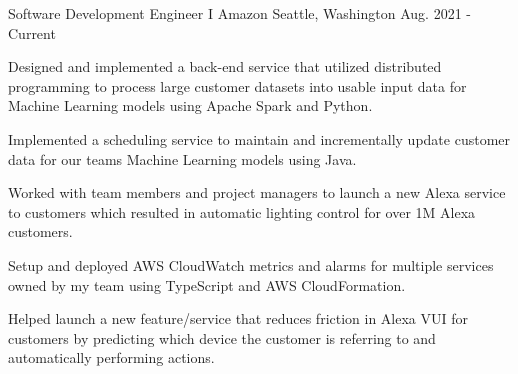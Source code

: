 

\begin{cventries}

  \cventry
  {Software Development Engineer I} %
  {Amazon} %
  {Seattle, Washington} %
  {Aug. 2021 - Current} %
  {
    \begin{cvitems} %
      \item {Designed and implemented a back-end service that utilized distributed programming to process large customer datasets into usable input data for Machine Learning models using Apache Spark and Python.}
      \item {Implemented a scheduling service to maintain and incrementally update customer data for our teams Machine Learning models using Java.}
      \item {Worked with team members and project managers to launch a new Alexa service to customers which resulted in automatic lighting control for over 1M Alexa customers.}
      \item {Setup and deployed AWS CloudWatch metrics and alarms for multiple services owned by my team using TypeScript and AWS CloudFormation.}
      \item {Helped launch a new feature/service that reduces friction in Alexa VUI for customers by predicting which device the customer is referring to and automatically performing actions.}
    \end{cvitems}
  }


\end{cventries}
